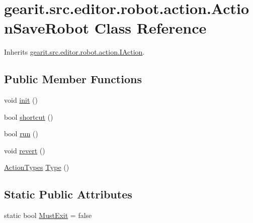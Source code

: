 \hypertarget{classgearit_1_1src_1_1editor_1_1robot_1_1action_1_1_action_save_robot}{\section{gearit.\+src.\+editor.\+robot.\+action.\+Action\+Save\+Robot Class Reference}
\label{classgearit_1_1src_1_1editor_1_1robot_1_1action_1_1_action_save_robot}
}


Inherits \hyperlink{interfacegearit_1_1src_1_1editor_1_1robot_1_1action_1_1_i_action}{gearit.\+src.\+editor.\+robot.\+action.\+I\+Action}.

\subsection*{Public Member Functions}
\begin{DoxyCompactItemize}
\item 
void \hyperlink{classgearit_1_1src_1_1editor_1_1robot_1_1action_1_1_action_save_robot_ac6a2545c4272a06f817f7fd69675960d}{init} ()
\item 
bool \hyperlink{classgearit_1_1src_1_1editor_1_1robot_1_1action_1_1_action_save_robot_a9355768000d1d1a55fab3d1eaedd744c}{shortcut} ()
\item 
bool \hyperlink{classgearit_1_1src_1_1editor_1_1robot_1_1action_1_1_action_save_robot_ac00199cf7467b69bee97158569e48084}{run} ()
\item 
void \hyperlink{classgearit_1_1src_1_1editor_1_1robot_1_1action_1_1_action_save_robot_a0ca944059614d3f2e7b5e45d656adb79}{revert} ()
\item 
\hyperlink{namespacegearit_1_1src_1_1editor_1_1robot_1_1action_a4be0fd46e3952d6135136b20e7b3fc5e}{Action\+Types} \hyperlink{classgearit_1_1src_1_1editor_1_1robot_1_1action_1_1_action_save_robot_adb881ee1e8eb71a78bb69e51a5bcaa76}{Type} ()
\end{DoxyCompactItemize}
\subsection*{Static Public Attributes}
\begin{DoxyCompactItemize}
\item 
static bool \hyperlink{classgearit_1_1src_1_1editor_1_1robot_1_1action_1_1_action_save_robot_a1e9f155658ba5dc3cd2a74e2898ba7a8}{Must\+Exit} = false
\end{DoxyCompactItemize}
